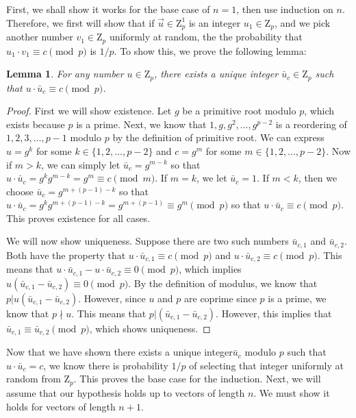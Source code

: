 \documentclass[psamsfonts]{amsart}
\newtheorem{lem}[thm]{Lemma}
\newenvironment{sol}{{\bfseries Solution}}{\qedsymbol}
\theoremstyle{definition}
\theoremstyle{remark}
\numberwithin{equation}{section}
\begin{document}
\begin{sol}
First, we shall show it works for the base case of $n = 1$, then use induction on $n$. Therefore, we first will show that if $\vec{u} \in \mathrm{Z}_p^1$ is an integer $u_1 \in \mathrm{Z}_p$, and we pick another number $v_1 \in \mathrm{Z}_p$ uniformly at random, the the probability that $u_1 \cdot v_1 \equiv c \pmod{p}$ is $1/p$. To show this, we prove the following lemma:

\begin{lem}
For any number $u \in \mathrm{Z}_p$, there exists a unique integer $\bar{u}_c \in \mathrm{Z}_p$ such that $u \cdot \bar{u}_c \equiv c \pmod{p}$. 
\end{lem}

\begin{proof}
First we will show existence. Let $g$ be a primitive root modulo $p$, which exists because $p$ is a prime. Next, we know that $1,g,g^2, \ldots, g^{p-2}$ is a reordering of $1,2,3, \ldots, p-1$ modulo $p$ by the definition of primitive root. We can express $u = g^k$ for some $k \in \{1,2,\ldots, p-2\}$ and $c = g^m$ for some $m \in \{1,2,\ldots, p-2\}$. Now if $m > k$, we can simply let $\bar{u}_c = g^{m - k}$ so that $u \cdot \bar{u}_c = g^{k} g^{m - k} = g^{m} \equiv c \pmod{m}$. If $m = k$, we let $\bar{u}_c = 1$. If $m < k$, then we choose $\bar{u}_c = g^{m + (p-1) - k}$ so that $u \cdot \bar{u}_c = g^{k} g^{m + (p-1) - k} = g^{m + (p-1)} \equiv g^{m} \pmod{p}$ so that $u \cdot \bar{u}_c \equiv c \pmod{p}$. This proves existence for all cases. 

We will now show uniqueness. Suppose there are two such numbers $\bar{u}_{c,1}$ and $\bar{u}_{c,2}$. Both have the property that $u \cdot \bar{u}_{c,1} \equiv c \pmod{p}$ and $u \cdot \bar{u}_{c,2} \equiv c \pmod{p}$. This means that $u \cdot \bar{u}_{c,1} - u \cdot \bar{u}_{c,2} \equiv 0 \pmod{p}$, which implies $u (\bar{u}_{c,1} - \bar{u}_{c,2}) \equiv 0 \pmod{p}$. By the definition of modulus, we know that $p | u (\bar{u}_{c,1} - \bar{u}_{c,2})$. However, since $u$ and $p$ are coprime since $p$ is a prime, we know that $p \nmid u$. This means that $p | (\bar{u}_{c,1} - \bar{u}_{c,2}) $. However, this implies that $\bar{u}_{c,1} \equiv \bar{u}_{c,2} \pmod{p}$, which shows uniqueness. 
\end{proof}

Now that we have shown there exists a unique integer$\bar{u}_c$ modulo $p$  such that $u \cdot \bar{u}_c = c$, we know there is probability $1/p$ of selecting that integer uniformly at random from $\mathrm{Z}_p$. This proves the base case for the induction. Next, we will assume that our hypothesis holds up to vectors of length $n$. We must show it holds for vectors of length $n+1$. 


\end{sol}
\end{document}
